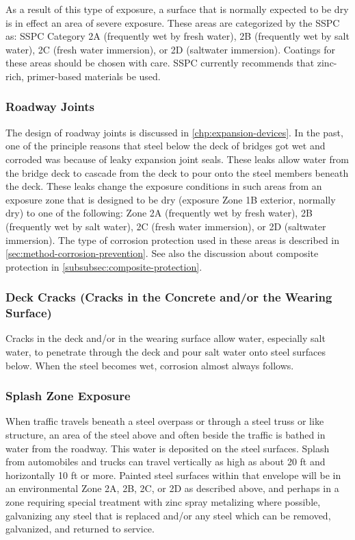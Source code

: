 As a result of this type of exposure, a surface that is normally expected to be dry is in effect an area of severe
exposure. These areas are categorized by the SSPC as: SSPC Category 2A (frequently wet by fresh water), 2B
(frequently wet by salt water), 2C (fresh water immersion), or 2D (saltwater immersion). Coatings for these areas
should be chosen with care. SSPC currently recommends that zinc-rich, primer-based materials be used.


\subsubsection{Roadway Joints}
The design of roadway joints is discussed in \cref{chp:expansion-devices}. In the past, one of the principle reasons that steel below
the deck of bridges got wet and corroded was because of leaky expansion joint seals. These leaks allow water from
the bridge deck to cascade from the deck to pour onto the steel members beneath the deck. These leaks change the
exposure conditions in such areas from an exposure zone that is designed to be dry (exposure Zone 1B exterior,
normally dry) to one of the following: Zone 2A (frequently wet by fresh water), 2B (frequently wet by salt water), 2C
(fresh water immersion), or 2D (saltwater immersion). The type of corrosion protection used in these areas is
described in \cref{sec:method-corrosion-prevention}. See also the discussion about composite protection in \cref{subsubsec:composite-protection}.

\subsubsection{Deck Cracks (Cracks in the Concrete and/or the Wearing Surface)}
Cracks in the deck and/or in the wearing surface allow water, especially salt water, to penetrate through the deck
and pour salt water onto steel surfaces below. When the steel becomes wet, corrosion almost always follows.

\subsubsection{Splash Zone Exposure}
When traffic travels beneath a steel overpass or through a steel truss or like structure, an area of the steel above
and often beside the traffic is bathed in water from the roadway. This water is deposited on the steel surfaces. Splash
from automobiles and trucks can travel vertically as high as about 20 ft and horizontally 10 ft or more. Painted steel
surfaces within that envelope will be in an environmental Zone 2A, 2B, 2C, or 2D as described above, and perhaps in
a zone requiring special treatment with zinc spray metalizing where possible, galvanizing any steel that is replaced
and/or any steel which can be removed, galvanized, and returned to service.

